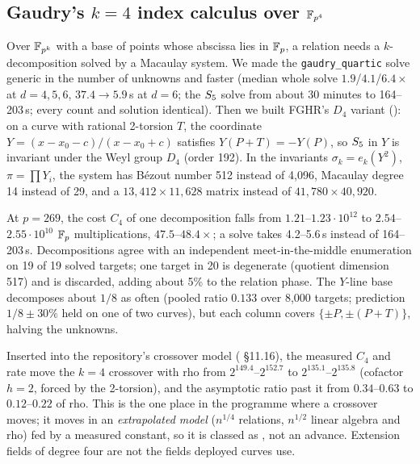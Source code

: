 \subsection{Gaudry's $k=4$ index calculus over $\mathbb{F}_{p^4}$}\label{sec:gaudry}

Over $\mathbb{F}_{p^k}$ with a base of points whose abscissa lies in $\mathbb{F}_p$, a
relation needs a $k$-decomposition solved by a Macaulay system. We made the
\texttt{gaudry\_quartic} solve generic in the number of unknowns and faster
(median whole solve $1.9$/$4.1$/$6.4\times$ at $d=4,5,6$, $37.4\to5.9$\,s
at $d=6$; the $S_{5}$ solve from about 30 minutes to 164--203\,s; every
count and solution identical). Then we built FGHR's $D_4$ variant
(): on a curve with rational
2-torsion $T$, the coordinate $Y=(x-x_0-c)/(x-x_0+c)$ satisfies
$Y(P+T)=-Y(P)$, so $S_{5}$ in $Y$ is invariant under the Weyl group $D_4$
(order 192). In the invariants $\sigma_k=e_k(Y^2)$, $\pi=\prod Y_i$, the
system has B\'ezout number 512 instead of 4{,}096, Macaulay degree 14
instead of 29, and a $13{,}412\times11{,}628$ matrix instead of
$41{,}780\times40{,}920$.

At $p=269$, the cost $C_4$ of one decomposition falls from
$1.21$--$1.23\cdot10^{12}$ to $2.54$--$2.55\cdot10^{10}$ $\mathbb{F}_p$
multiplications, $47.5$--$48.4\times$; a solve takes 4.2--5.6\,s instead of
164--203\,s. Decompositions agree with an independent meet-in-the-middle
enumeration on 19 of 19 solved targets; one target in 20 is degenerate
(quotient dimension 517) and is discarded, adding about 5\% to the
relation phase. The $Y$-line base decomposes about $1/8$ as often (pooled
ratio $0.133$ over 8{,}000 targets; prediction $1/8\pm30\%$ held on one of
two curves), but each column covers $\{\pm P,\pm(P+T)\}$, halving the
unknowns.

Inserted into the repository's crossover model
( \S11.16), the measured $C_4$ and rate move
the $k=4$ crossover with rho from $2^{149.4}$--$2^{152.7}$ to
$2^{135.1}$--$2^{135.8}$ (cofactor $h=2$, forced by the 2-torsion), and
the asymptotic ratio past it from $0.34$--$0.63$ to $0.12$--$0.22$ of rho.
This is the one place in the programme where a crossover moves; it moves
in an \emph{extrapolated model} ($n^{1/4}$ relations, $n^{1/2}$ linear
algebra and rho) fed by a measured constant, so it is classed as
, not an advance. Extension fields of degree four are not
the fields deployed curves use.

